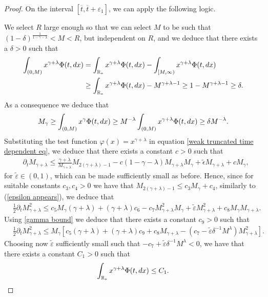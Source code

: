 \documentclass[11pt]{article}
\numberwithin{equation}{section}
\theoremstyle{plain}
\newcommand{\der}{\textup{d}}
\begin{document}
\begin{proof}
On the interval $[\overline{t},\overline{t}+\varepsilon_{1}]$, we can apply the following logic.

We select $R$ large enough so that we can select $M$ to be such that $(1-\delta)^{\frac{1}{1-\gamma-\lambda}} < M < R$, but independent on $R$, and we deduce that there exists a $\delta >0$ such that
\begin{align*}
\int_{(0, M ) } x^{\gamma + \lambda}  \Phi(t,\der x)
&= \int_{\mathbb R_* } x^{\gamma + \lambda}\Phi(t, \der x) - \int_{[M, \infty ) } x^{\gamma + \lambda} \Phi(t, \der x) \\
&\geq \int_{\mathbb R_* } x^{\gamma + \lambda}\Phi(t, \der x)- M^{\gamma + \lambda -1 }\geq 1- M^{\gamma + \lambda -1 } \geq \delta. 
\end{align*}
As a consequence we deduce that 
\begin{equation} \label{gamma bound}
M_\gamma  \geq \int_{(0, M)} x^{\gamma} \Phi(t, \der x )  \geq M^{-\lambda} \int_{(0,M)} x^{\gamma+\lambda} \Phi(t, \der x)  \geq  \delta M^{- \lambda}. 
\end{equation}
Substituting the test function $\varphi(x)=x^{\gamma + \lambda} $ in equation \eqref{weak truncated time dependent eq},
we deduce that there exists a constant $c>0$ such that
\begin{align*}
&\partial_t M_{\gamma + \lambda } \leq \frac{\gamma + \lambda}{M_{\gamma+\lambda} } M_{2(\gamma + \lambda ) -1 } - c (1-\gamma -\lambda ) M_{\gamma +\lambda} M_\gamma+ \tilde{\epsilon}  M_{\gamma +\lambda} + c M_\gamma, 
\end{align*}
for $\tilde{\varepsilon}\in(0,1)$, which can be made sufficiently small as before. Hence, since for suitable constants $c_3, c_4 >0$ we have that $M_{2(\gamma+\lambda )-1} \leq c_3 M_\gamma + c_4$, similarly to (\ref{epsilon appears}), we deduce that
\begin{align*}
&\frac{1}{2}\partial_t M^2_{\gamma + \lambda } 
\leq c_5 M_{\gamma }   (\gamma + \lambda)  +(\gamma + \lambda) c_6 - c_7 M^2_{\gamma + \lambda } M_\gamma+\tilde{\varepsilon} M_{\gamma +\lambda}^{2}+c_{8} M_\gamma M_{\gamma+\lambda}.
\end{align*}
 Using \eqref{gamma bound} we deduce that there exists a constant $c_{9}>0$ such that
\begin{align*}
    &\frac{1}{2}\partial_t M^2_{\gamma + \lambda } 
\leq M_{\gamma }  \left[c_5   (\gamma + \lambda)  +(\gamma + \lambda) c_{9}  +c_{8}M_{\gamma+\lambda}-(c_7-\tilde{\varepsilon}\delta^{-1} M^{\lambda}) M^2_{\gamma + \lambda }  \right] .
\end{align*}
Choosing now $\tilde{\varepsilon}$ sufficiently small such that $-c_7+\tilde{\varepsilon}\delta^{-1} M^{\lambda}<0$, we have that there exists a constant $C_{1}>0$ such that 
\begin{align}\label{constant for gamma lambda}
\int_{\mathbb R_*} x^{\gamma + \lambda } \Phi(t, \der x ) \leq C_{1}. 
\end{align}


\end{proof}
\end{document}

